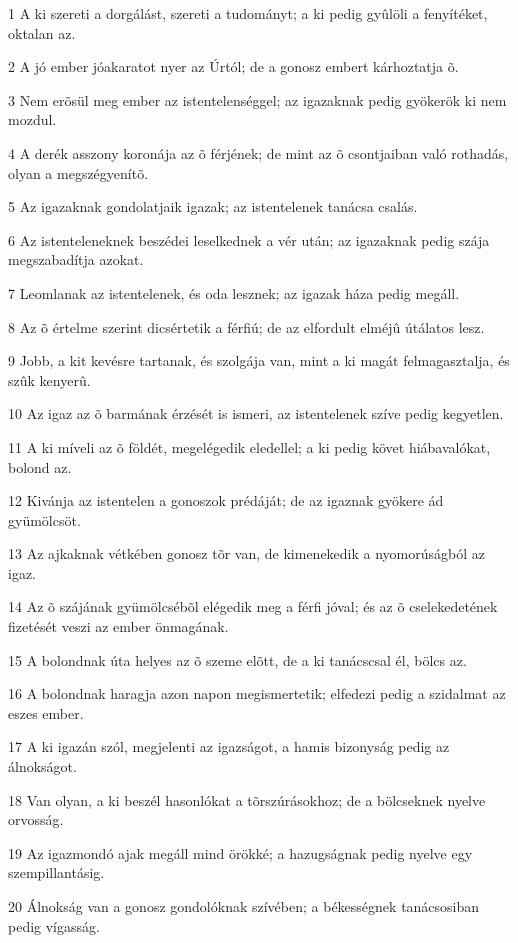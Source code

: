 \par 1 A ki szereti a dorgálást, szereti a tudományt; a ki pedig gyûlöli a fenyítéket, oktalan az.
\par 2 A jó ember jóakaratot nyer az Úrtól; de a gonosz embert kárhoztatja õ.
\par 3 Nem erõsül meg ember az istentelenséggel; az igazaknak pedig gyökerök  ki nem mozdul.
\par 4 A derék asszony koronája az õ férjének; de mint az õ csontjaiban való rothadás, olyan a megszégyenítõ.
\par 5 Az igazaknak gondolatjaik igazak; az istentelenek tanácsa csalás.
\par 6 Az istenteleneknek beszédei leselkednek a vér után; az igazaknak pedig szája megszabadítja azokat.
\par 7 Leomlanak az istentelenek, és oda lesznek; az igazak háza pedig megáll.
\par 8 Az õ értelme szerint dicsértetik a férfiú; de az elfordult elméjû útálatos lesz.
\par 9 Jobb, a kit kevésre tartanak, és szolgája van, mint a ki magát felmagasztalja, és szûk kenyerû.
\par 10 Az igaz az õ barmának érzését is ismeri, az istentelenek szíve pedig kegyetlen.
\par 11 A ki míveli az õ földét, megelégedik eledellel; a ki pedig követ hiábavalókat, bolond az.
\par 12 Kivánja az istentelen a gonoszok prédáját; de az igaznak gyökere ád gyümölcsöt.
\par 13 Az ajkaknak vétkében gonosz tõr van, de kimenekedik a nyomorúságból az igaz.
\par 14 Az õ szájának gyümölcsébõl elégedik meg a férfi jóval; és az õ cselekedetének fizetését veszi az ember önmagának.
\par 15 A bolondnak úta helyes az õ szeme elõtt, de a ki tanácscsal él, bölcs az.
\par 16 A bolondnak haragja azon napon megismertetik; elfedezi pedig a szidalmat az eszes ember.
\par 17 A ki igazán szól, megjelenti az igazságot, a hamis bizonyság pedig az álnokságot.
\par 18 Van olyan, a ki beszél hasonlókat a tõrszúrásokhoz; de a bölcseknek nyelve orvosság.
\par 19 Az igazmondó ajak megáll mind örökké; a hazugságnak pedig nyelve egy szempillantásig.
\par 20 Álnokság van a gonosz gondolóknak szívében; a békességnek tanácsosiban pedig vígasság.
